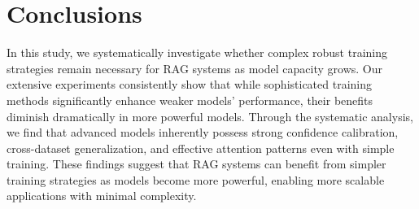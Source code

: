 \section{Conclusions}
In this study, we systematically investigate whether complex robust training strategies remain necessary for RAG systems as model capacity grows. Our extensive experiments consistently show that while sophisticated training methods significantly enhance weaker models' performance, their benefits diminish dramatically in more powerful models. Through the systematic analysis, we find that advanced models inherently possess strong confidence calibration, cross-dataset generalization, and effective attention patterns even with simple training. These findings suggest that RAG systems can benefit from simpler training strategies as models become more powerful, enabling more scalable applications with minimal complexity.
